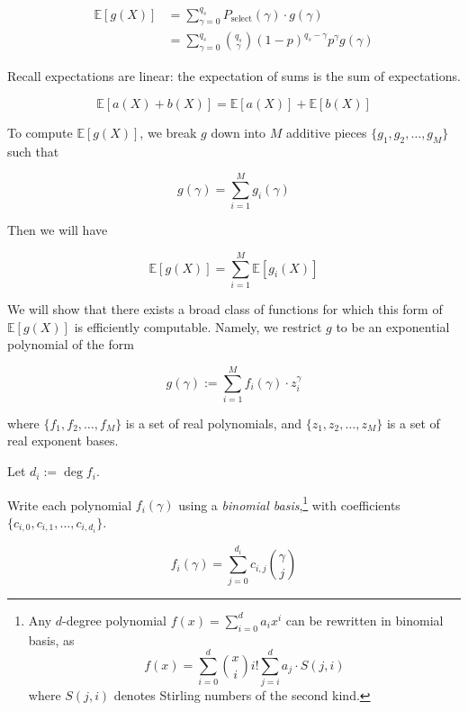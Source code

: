 \documentclass[11pt]{article}
\begin{document}
\begin{align}
  \mathbb E[g(X)]
    &= \sum_{\gamma=0}^{q_s} P_\text{select}(\gamma) \cdot g(\gamma) \\
    &= \sum_{\gamma=0}^{q_s} \binom{q_s}{\gamma} \left( 1 - p \right)^{q_s - \gamma} p^\gamma g(\gamma)
    \label{eq:exp-op}
\end{align}

Recall expectations are linear: the expectation of sums is the sum of expectations.

\begin{equation}
  \mathbb E[a(X) + b(X)] = \mathbb E[a(X)] + \mathbb E[b(X)]
\end{equation}

To compute $\mathbb E[g(X)]$, we break $g$ down into $M$ additive pieces $\{g_1, g_2, \ldots, g_M\}$ such that

\begin{equation}
  g(\gamma) = \sum_{i=1}^M g_i(\gamma)
\end{equation}

Then we will have

\begin{equation}
  \mathbb E[g(X)] = \sum_{i=1}^M \mathbb E[g_i(X)]
\end{equation}

\bigskip

We will show that there exists a broad class of functions for which this form of $\mathbb E[g(X)]$ is efficiently computable. Namely, we restrict $g$ to be an exponential polynomial of the form

\begin{equation}
\label{eq:exponential-polynomial}
  g(\gamma) := \sum_{i=1}^M f_i(\gamma) \cdot z_i^\gamma
\end{equation}

where $\{f_1, f_2, \ldots, f_M\}$ is a set of real polynomials, and $\{z_1, z_2, \ldots, z_M\}$ is a set of real exponent bases.

Let $d_i := \deg f_i$.

Write each polynomial $f_i(\gamma)$ using a \emph{binomial basis},\footnote{Any $d$-degree polynomial $f(x) = \sum_{i=0}^d a_i x^i$ can be rewritten in binomial basis, as $$f(x) = \sum_{i=0}^d \binom{x}{i} i! \sum_{j=i}^d a_j \cdot S(j, i)$$ where $S(j, i)$ denotes Stirling numbers of the second kind.} with coefficients $\{c_{i, 0}, c_{i, 1}, \ldots, c_{i, d_i}\}$.

\begin{equation}
  f_i(\gamma) = \sum_{j=0}^{d_i} c_{i,j} \binom{\gamma}{j}
\end{equation}
\end{document}
